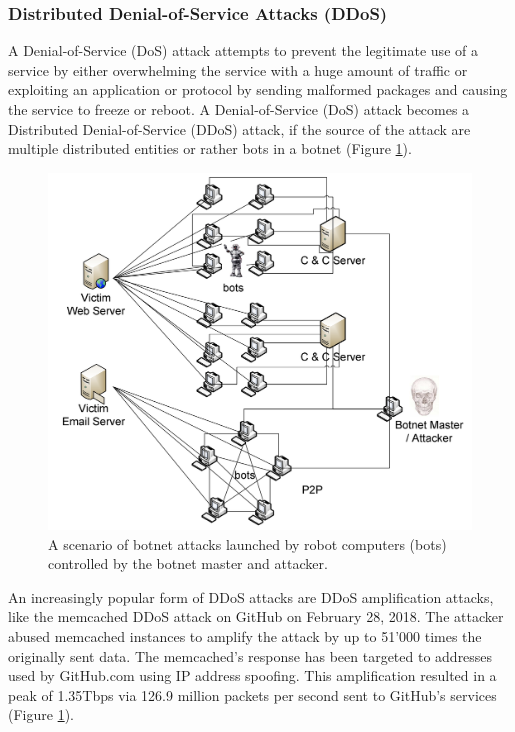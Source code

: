		\subsubsection{Distributed Denial-of-Service Attacks (DDoS)}
A Denial-of-Service (DoS) attack attempts to prevent the legitimate use of a service by either overwhelming the service with a huge amount of traffic or exploiting an application or protocol by sending malformed packages and causing the service to freeze or reboot. A Denial-of-Service (DoS) attack becomes a Distributed Denial-of-Service (DDoS) attack, if the source of the attack are multiple distributed entities or rather bots in a botnet (Figure \ref{fig:ddos}). \cite{Mirkovic04}

\begin{figure}[ht]
\begin{center} \includegraphics[scale=0.4]{Talk11/DDoS-attack} \end{center}
\caption{A scenario of botnet attacks launched by robot computers (bots) controlled by the botnet master and attacker. \cite{Li09}}
\label{fig:ddos}
\end{figure}

An increasingly popular form of DDoS attacks are DDoS amplification attacks, like the memcached DDoS attack on GitHub on February 28, 2018. The attacker abused memcached instances to amplify the attack by up to 51'000 times the originally sent data. The memcached's response has been targeted to addresses used by GitHub.com using IP address spoofing. This amplification resulted in a peak of 1.35Tbps via 126.9 million packets per second sent to GitHub's services (Figure \ref{fig:ddos}). \cite{Kottler18}

